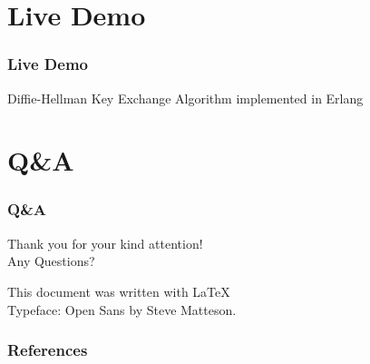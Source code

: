 \documentclass[aspectratio=169]{beamer}
\begin{document}
\section{Live Demo}

\begin{frame}

\frametitle{Live Demo}

\begin{center}
Diffie-Hellman Key Exchange Algorithm implemented in Erlang
\end{center}

\end{frame}

\section{Q\&A}
\begin{frame}

\frametitle{Q\&A}

\begin{center}
Thank you for your kind attention!\\
Any Questions?

\vfill
This document was written with \LaTeX 
\\Typeface: Open Sans by Steve Matteson.
\end{center}

\end{frame}

\begin{frame}

\frametitle{References}

\begin{tiny}




\end{tiny}

\end{frame}

\end{document}
